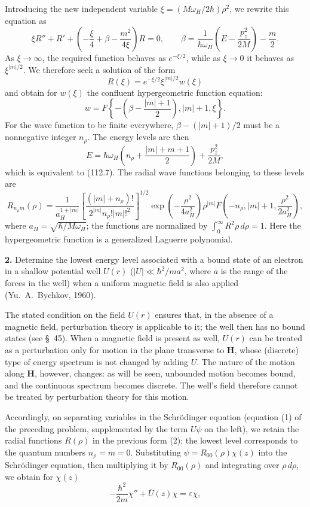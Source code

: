 Introducing the new independent variable $\xi=(M\omega_H/2\hbar)\rho^2$, we rewrite this equation as
\[
 \xi R''+R'+\left(-\frac\xi4+\beta-\frac{m^2}{4\xi}\right)R=0,\qquad
 \beta=\frac1{\hbar\omega_H}\left(E-\frac{p_z^2}{2M}\right)-\frac m2.
\]
As $\xi\to\infty$, the required function behaves as $e^{-\xi/2}$, while as $\xi\to0$ it behaves as $\xi^{|m|/2}$. We therefore seek a solution of the form
\[
 R(\xi)=e^{-\xi/2}\xi^{|m|/2}w(\xi)
\]
and obtain for $w(\xi)$ the confluent hypergeometric function equation:
\[
 w=F\left\{-\left(\beta-\frac{|m|+1}{2}\right),|m|+1,\xi\right\}.
\]
For the wave function to be finite everywhere, $\beta-(|m|+1)/2$ must be a nonnegative integer $n_\rho$. The energy levels are then
\[
 E=\hbar\omega_H\left(n_\rho+\frac{|m|+m+1}{2}\right)+\frac{p_z^2}{2M},
\]
which is equivalent to (112.7). The radial wave functions belonging to these levels are
\begin{equation}
 R_{n_\rho m}(\rho)=\frac1{a_H^{1+|m|}}\left[\frac{(|m|+n_\rho)!}{2^{|m|}n_\rho!|m|!^2}\right]^{1/2}\exp\left(-\frac{\rho^2}{4a_H^2}\right)\rho^{|m|}F\left(-n_\rho,|m|+1,\frac{\rho^2}{2a_H^2}\right),
 \tag{2}
\end{equation}
where $a_H=\sqrt{\hbar/M\omega_H}$; the functions are normalized by $\int_0^\infty R^2\rho\,d\rho=1$. Here the hypergeometric function is a generalized Laguerre polynomial.

\ProblemHeading\textbf{2.} Determine the lowest energy level associated with a bound state of an electron in a shallow potential well $U(r)$ ($|U|\ll\hbar^2/ma^2$, where $a$ is the range of the forces in the well) when a uniform magnetic field is also applied (Yu.~A.~Bychkov, 1960).

\SolutionHeading The stated condition on the field $U(r)$ ensures that, in the absence of a magnetic field, perturbation theory is applicable to it; the well then has no bound states (see \S~45). When a magnetic field is present as well, $U(r)$ can be treated as a perturbation only for motion in the plane transverse to $\mathbf H$, whose (discrete) type of energy spectrum is not changed by adding $U$. The nature of the motion along $\mathbf H$, however, changes: as will be seen, unbounded motion becomes bound, and the continuous spectrum becomes discrete. The well's field therefore cannot be treated by perturbation theory for this motion.

Accordingly, on separating variables in the Schrödinger equation (equation (1) of the preceding problem, supplemented by the term $U\psi$ on the left), we retain the radial functions $R(\rho)$ in the previous form (2); the lowest level corresponds to the quantum numbers $n_\rho=m=0$. Substituting $\psi=R_{00}(\rho)\chi(z)$ into the Schrödinger equation, then multiplying it by $R_{00}(\rho)$ and integrating over $\rho\,d\rho$, we obtain for $\chi(z)$
\begin{equation}
 -\frac{\hbar^2}{2m}\chi''+\overline U(z)\chi=\varepsilon\chi,
 \tag{3}
\end{equation}

